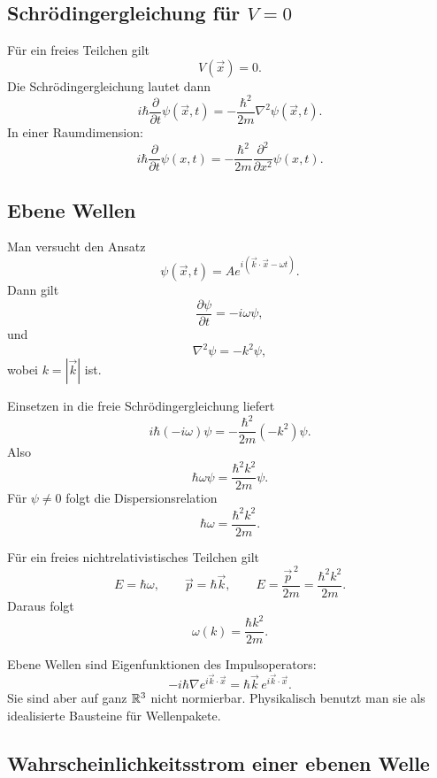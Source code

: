 \subsection{Schrödingergleichung für $V=0$}

Für ein freies Teilchen gilt
\[
    V(\vec{x})=0.
\]
Die Schrödingergleichung lautet dann
\[
    i\hbar\frac{\partial}{\partial t}\psi(\vec{x},t)
    =-\frac{\hbar^2}{2m}\nabla^2\psi(\vec{x},t).
\]
In einer Raumdimension:
\[
    i\hbar\frac{\partial}{\partial t}\psi(x,t)
    =-\frac{\hbar^2}{2m}\frac{\partial^2}{\partial x^2}\psi(x,t).
\]

\subsection{Ebene Wellen}

Man versucht den Ansatz
\[
    \psi(\vec{x},t)=A e^{i(\vec{k}\cdot\vec{x}-\omega t)}.
\]
Dann gilt
\[
    \frac{\partial\psi}{\partial t}=-i\omega\psi,
\]
und
\[
    \nabla^2\psi=-k^2\psi,
\]
wobei $k=|\vec{k}|$ ist.

\begin{derivationbox}
Einsetzen in die freie Schrödingergleichung liefert
\[
    i\hbar(-i\omega)\psi
    =-\frac{\hbar^2}{2m}(-k^2)\psi.
\]
Also
\[
    \hbar\omega\psi=\frac{\hbar^2k^2}{2m}\psi.
\]
Für $\psi\neq 0$ folgt die Dispersionsrelation
\[
    \hbar\omega=\frac{\hbar^2k^2}{2m}.
\]
\end{derivationbox}

\begin{formulabox}
Für ein freies nichtrelativistisches Teilchen gilt
\[
    E=\hbar\omega,
    \qquad
    \vec{p}=\hbar\vec{k},
    \qquad
    E=\frac{\vec{p}^{\,2}}{2m}=\frac{\hbar^2k^2}{2m}.
\]
Daraus folgt
\[
    \omega(k)=\frac{\hbar k^2}{2m}.
\]
\end{formulabox}

\begin{notebox}
Ebene Wellen sind Eigenfunktionen des Impulsoperators:
\[
    -i\hbar\nabla e^{i\vec{k}\cdot\vec{x}}
    =\hbar\vec{k}\,e^{i\vec{k}\cdot\vec{x}}.
\]
Sie sind aber auf ganz $\mathbb{R}^3$ nicht normierbar. Physikalisch benutzt man sie als idealisierte Bausteine für Wellenpakete.
\end{notebox}

\subsection{Wahrscheinlichkeitsstrom einer ebenen Welle}


